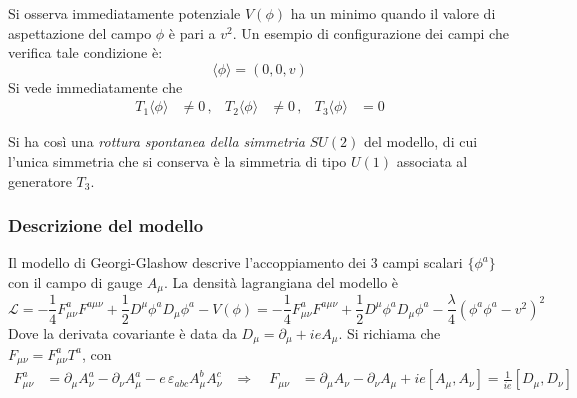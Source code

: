 Si osserva immediatamente potenziale $V(\phi)$ ha un minimo quando il valore di
aspettazione del campo $\phi$ è pari a $v^2$. Un esempio di configurazione dei
campi che verifica tale condizione è:
   $$ \langle \phi \rangle = (0,0,v) $$
Si vede immediatamente che
\begin{equation}
   \begin{aligned}
      T_1 \langle \phi \rangle & \neq 0 \, , &
      T_2 \langle \phi \rangle & \neq 0 \, , &
      T_3 \langle \phi \rangle & = 0
   \end{aligned}
\end{equation}

Si ha così una \emph{rottura spontanea della simmetria} $SU(2)$ del modello, di cui l'unica
simmetria che si conserva è la simmetria di tipo $U(1)$ associata al generatore $T_3$.\\
\subsubsection{Descrizione del modello}
Il modello di Georgi-Glashow descrive l'accoppiamento dei 3 campi scalari
$\{\phi^a\}$ con il campo di gauge $A_\mu$. La densità lagrangiana del modello è
\begin{equation}
   \mathcal{L} = - \frac{1}{4} F^a_{\mu\nu}F^{a\mu\nu}
                 + \frac{1}{2} D^\mu\phi^a D_\mu \phi^a - V(\phi)
               = - \frac{1}{4} F^a_{\mu\nu}F^{a\mu\nu}
                 + \frac{1}{2} D^\mu\phi^a D_\mu \phi^a
                 - \frac{\lambda}{4}( \phi^a\phi^a - v^2 )^2
\end{equation}
Dove la derivata covariante è data da $D_\mu = \partial _\mu + ie A_\mu$.
Si richiama che $F_{\mu\nu} = F^a_{\mu\nu} T^a$, con
\begin{equation}
   \begin{aligned}
   F^a_{\mu\nu} & = \partial _\mu A_\nu^a - \partial _\nu A^a_\mu
                   - e \, \varepsilon_{abc} A_\mu^b A_\nu^c
   & \Rightarrow \quad
   F_{\mu\nu}  & = \partial _\mu A_\nu - \partial _\nu A_\mu + ie [A_\mu,A_\nu]
                = \frac{1}{ie}[D_\mu , D_\nu]
  \end{aligned}
\end{equation}

